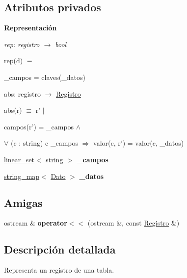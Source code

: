 \subsection*{Atributos privados}
\begin{Indent}{\bf Representación}\par
{\em rep\-: registro $\to$ bool\par
rep(d) $\equiv$
\begin{DoxyItemize}
\item \-\_\-campos = claves(\-\_\-datos)
\end{DoxyItemize}

abs\-: registro $\to$ \hyperlink{classRegistro}{Registro}\par
abs(r) $\equiv$ r' $|$
\begin{DoxyItemize}
\item campos(r') = \-\_\-campos $\land$
\item $\forall$ (c \-: string) c  \-\_\-campos $\Rightarrow$ valor(c, r') = valor(c, \-\_\-datos) 
\end{DoxyItemize}}\begin{DoxyCompactItemize}
\item 
\hypertarget{classRegistro_ad6c12d81cb20086a4642f4b85fe8063b}{\hyperlink{classlinear__set}{linear\-\_\-set}$<$ string $>$ {\bfseries \-\_\-campos}}\label{classRegistro_ad6c12d81cb20086a4642f4b85fe8063b}

\item 
\hypertarget{classRegistro_aa23f2dcc0afcca1c5c00b5272f4c1b20}{\hyperlink{classstring__map}{string\-\_\-map}$<$ \hyperlink{classDato}{Dato} $>$ {\bfseries \-\_\-datos}}\label{classRegistro_aa23f2dcc0afcca1c5c00b5272f4c1b20}

\end{DoxyCompactItemize}
\end{Indent}
\subsection*{Amigas}
\begin{DoxyCompactItemize}
\item 
\hypertarget{classRegistro_a66788288d92ef16b5a3aab86ae6d87fc}{ostream \& {\bfseries operator$<$$<$} (ostream \&, const \hyperlink{classRegistro}{Registro} \&)}\label{classRegistro_a66788288d92ef16b5a3aab86ae6d87fc}

\end{DoxyCompactItemize}


\subsection{Descripción detallada}
Representa un registro de una tabla. 

